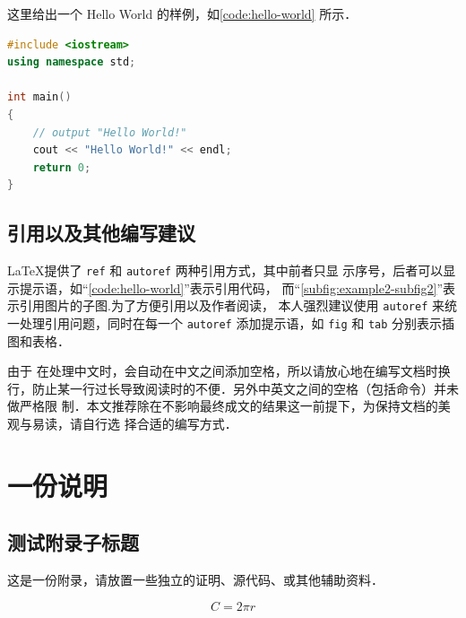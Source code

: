 \documentclass[lang=chs, degree=phd, blindreview=false, adobe=true]{yanputhesis}
\begin{document}
这里给出一个 Hello World 的样例，如\autoref{code:hello-world} 所示．

\begin{lstlisting}[language={C++}, label={code:hello-world},
    caption={Hello\_World.cpp}]
#include <iostream>
using namespace std;

int main()
{
    // output "Hello World!"
    cout << "Hello World!" << endl;
    return 0;
}
\end{lstlisting}

\section{引用以及其他编写建议}

\LaTeX 提供了 \lstinline`ref` 和 \lstinline`autoref` 两种引用方式，其中前者只显
示序号，后者可以显示提示语，如“\autoref{code:hello-world}”表示引用代码，
而“\autoref{subfig:example2-subfig2}”表示引用图片的子图.为了方便引用以及作者阅读，
本人强烈建议使用 \lstinline`autoref` 来统一处理引用问题，同时在每一个
\lstinline`autoref` 添加提示语，如 \lstinline`fig` 和 \lstinline`tab` 分别表示插
图和表格．

由于 \XeLaTeX 在处理中文时，会自动在中文之间添加空格，所以请放心地在编写文档时换
行，防止某一行过长导致阅读时的不便．另外中英文之间的空格（包括命令）并未做严格限
制．本文推荐除在不影响最终成文的结果这一前提下，为保持文档的美观与易读，请自行选
择合适的编写方式．

\cleardoublepage
\appendix
\chapter{一份说明}

\section{测试附录子标题}

这是一份附录，请放置一些独立的证明、源代码、或其他辅助资料．


\begin{equation}
    C = 2 \pi r
\end{equation}
\end{document}
